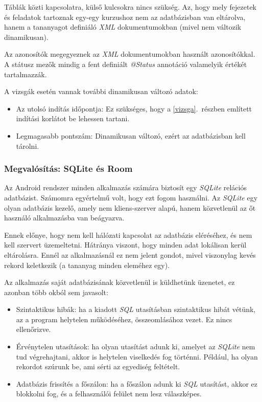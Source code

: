 \documentclass[12pt,a4paper]{article}
\newcommand{\xml}{\textit{XML}\xspace}
\begin{document}
	Táblák közti kapcsolatra, külső kulcsokra nincs szükség. Az, hogy mely fejezetek és feladatok tartoznak egy-egy kurzushoz nem az adatbázisban van eltárolva, hanem a tananyagot definiáló \xml dokumentumokban (mivel nem változik dinamikusan).
	
	Az azonosítók megegyeznek az \xml dokumentumokban használt azonosítókkal. A státusz mezők mindig a fent definiált \textit{@Status} annotáció valamelyik értékét tartalmazzák.
	
	A vizsgák esetén vannak további dinamikusan változó adatok:
	
	\begin{itemize}
		\item Az utolsó indítás időpontja: Ez szükséges, hogy a \ref{vizsga}.\ részben említett indítási korlátot be lehessen tartani.
		\item Legmagasabb pontszám: Dinamikusan változó, ezért az adatbázisban kell tárolni.
	\end{itemize}
	
	\subsubsection{Megvalósítás: SQLite és Room}\label{sqlite_roon}

	Az Android rendszer minden alkalmazás számára biztosít egy \textit{SQLite} relációs adatbázist. Számomra egyértelmű volt, hogy ezt fogom használni. Az \textit{SQLite} egy olyan adatbázis kezelő, amely nem kliens-szerver alapú, hanem közvetlenül az őt használó alkalmazásba van beágyazva. 
	
	Ennek előnye, hogy nem kell hálózati kapcsolat az adatbázis eléréséhez, és nem kell szervert üzemeltetni. Hátránya viszont, hogy minden adat lokálisan kerül eltárolásra. Ennél az alkalmazásnál ez nem jelent gondot, mivel viszonylag kevés rekord keletkezik (a tananyag minden eleméhez egy).
	
	Az alkalmazás saját adatbázisának közvetlenül is küldhetünk üzenetet, ez azonban több okból sem javasolt:
	
	\begin{itemize}
		\item Szintaktikus hibák: ha a kiadott \textit{SQL} utasításban szintaktikus hibát vétünk, az a program helytelen működéséhez, összeomlásához vezet. Ez nincs ellenőrizve.
		\item Érvénytelen utasítások: ha olyan utasítást adunk ki, amelyet az \textit{SQLite} nem tud végrehajtani, akkor is helytelen viselkedés fog történni. Például, ha olyan rekordot szúrunk be, ami sérti az egyediség feltételt.
		\item Adatbázis frissítés a főszálon: ha a főszálon adunk ki \textit{SQL} utasítást, akkor ez blokkolni fog, és a felhasználói felület nem lesz válaszképes. 
	\end{itemize}
\end{document}
